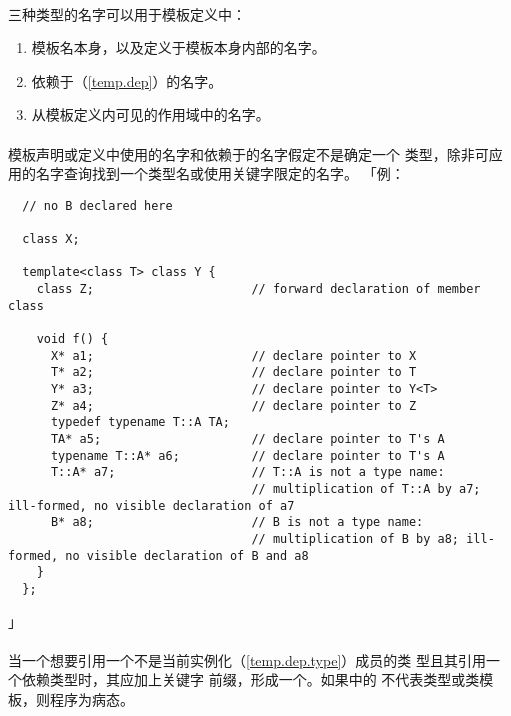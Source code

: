 \paragraph{}
三种类型的名字可以用于模板定义中：
\begin{enumerate}
  \item{模板名本身，以及定义于模板本身内部的名字。}
  \item{依赖于（\ref{temp.dep}）的名字。}
  \item{从模板定义内可见的作用域中的名字。}
\end{enumerate}

\paragraph{}
模板声明或定义中使用的名字和依赖于的名字假定不是确定一个
类型，除非可应用的名字查询找到一个类型名或使用关键字限定的名字。
「例：
\begin{lstlisting}
  // no B declared here

  class X;

  template<class T> class Y {
    class Z;                      // forward declaration of member class

    void f() {
      X* a1;                      // declare pointer to X
      T* a2;                      // declare pointer to T
      Y* a3;                      // declare pointer to Y<T>
      Z* a4;                      // declare pointer to Z
      typedef typename T::A TA;
      TA* a5;                     // declare pointer to T's A
      typename T::A* a6;          // declare pointer to T's A
      T::A* a7;                   // T::A is not a type name:
                                  // multiplication of T::A by a7; ill-formed, no visible declaration of a7
      B* a8;                      // B is not a type name:
                                  // multiplication of B by a8; ill-formed, no visible declaration of B and a8
    }
  };
\end{lstlisting}」

\paragraph{}
当一个想要引用一个不是当前实例化（\ref{temp.dep.type}）成员的类
型且其引用一个依赖类型时，其应加上关键字
前缀，形成一个。如果中的
不代表类型或类模板，则程序为病态。

